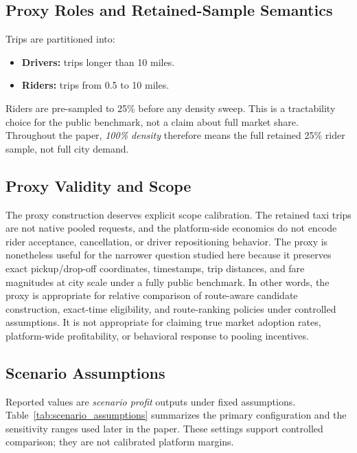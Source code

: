 \documentclass[journal]{IEEEtran}
\begin{document}
\subsection{Proxy Roles and Retained-Sample Semantics}
Trips are partitioned into:
\begin{itemize}
    \item \textbf{Drivers:} trips longer than 10 miles.
    \item \textbf{Riders:} trips from 0.5 to 10 miles.
\end{itemize}

Riders are pre-sampled to 25\% before any density sweep. This is a tractability choice for the public benchmark, not a claim about full market share. Throughout the paper, \emph{100\% density} therefore means the full retained 25\% rider sample, not full city demand.

\subsection{Proxy Validity and Scope}
The proxy construction deserves explicit scope calibration. The retained taxi trips are not native pooled requests, and the platform-side economics do not encode rider acceptance, cancellation, or driver repositioning behavior. The proxy is nonetheless useful for the narrower question studied here because it preserves exact pickup/drop-off coordinates, timestamps, trip distances, and fare magnitudes at city scale under a fully public benchmark. In other words, the proxy is appropriate for relative comparison of route-aware candidate construction, exact-time eligibility, and route-ranking policies under controlled assumptions. It is not appropriate for claiming true market adoption rates, platform-wide profitability, or behavioral response to pooling incentives.

\subsection{Scenario Assumptions}
Reported values are \emph{scenario profit} outputs under fixed assumptions. Table~\ref{tab:scenario_assumptions} summarizes the primary configuration and the sensitivity ranges used later in the paper. These settings support controlled comparison; they are not calibrated platform margins.
\end{document}
